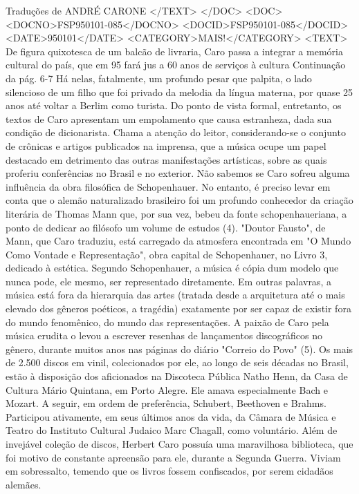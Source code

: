 Traduções de ANDRÉ CARONE
</TEXT>
</DOC>
<DOC>
<DOCNO>FSP950101-085</DOCNO>
<DOCID>FSP950101-085</DOCID>
<DATE>950101</DATE>
<CATEGORY>MAIS!</CATEGORY>
<TEXT>
De figura quixotesca de um balcão de livraria, Caro passa a integrar a memória cultural do país, que em 95 fará jus a 60 anos de serviços à cultura 
Continuação da pág. 6-7
Há nelas, fatalmente, um profundo pesar que palpita, o lado silencioso de um filho que foi privado da melodia da língua materna, por quase 25 anos até voltar a Berlim como turista. Do ponto de vista formal, entretanto, os textos de Caro apresentam um empolamento que causa estranheza, dada sua condição de dicionarista.
Chama a atenção do leitor, considerando-se o conjunto de crônicas e artigos publicados na imprensa, que a música ocupe um papel destacado em detrimento das outras manifestações artísticas, sobre as quais proferiu conferências no Brasil e no exterior.
Não sabemos se Caro sofreu alguma influência da obra filosófica de Schopenhauer. No entanto, é preciso levar em conta que o alemão naturalizado brasileiro foi um profundo conhecedor da criação literária de Thomas Mann que, por sua vez, bebeu da fonte schopenhaueriana, a ponto de dedicar ao filósofo um volume de estudos (4).
"Doutor Fausto", de Mann, que Caro traduziu, está carregado da atmosfera encontrada em "O Mundo Como Vontade e Representação", obra capital de Schopenhauer, no Livro 3, dedicado à estética. Segundo Schopenhauer, a música é cópia dum modelo que nunca pode, ele mesmo, ser representado diretamente. Em outras palavras, a música está fora da hierarquia das artes (tratada desde a arquitetura até o mais elevado dos gêneros poéticos, a tragédia) exatamente por ser capaz de existir fora do mundo fenomênico, do mundo das representações.
A paixão de Caro pela música erudita o levou a escrever resenhas de lançamentos discográficos no gênero, durante muitos anos nas páginas do diário "Correio do Povo" (5). Os mais de 2.500 discos em vinil, colecionados por ele, ao longo de seis décadas no Brasil, estão à disposição dos aficionados na Discoteca Pública Natho Henn, da Casa de Cultura Mário Quintana, em Porto Alegre.
Ele amava especialmente Bach e Mozart. A seguir, em ordem de preferência, Schubert, Beethoven e Brahms. Participou ativamente, em seus últimos anos da vida, da Câmara de Música e Teatro do Instituto Cultural Judaico Marc Chagall, como voluntário.
Além de invejável coleção de discos, Herbert Caro possuía uma maravilhosa biblioteca, que foi motivo de constante apreensão para ele, durante a Segunda Guerra. Viviam em sobressalto, temendo que os livros fossem confiscados, por serem cidadãos alemães.
